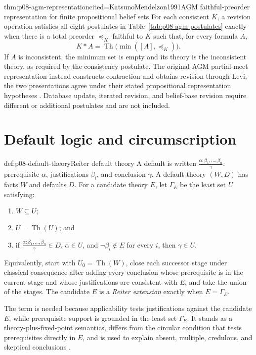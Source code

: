 \begin{hbtheorem}{thm:p08-agm-representation}{cited=KatsunoMendelzon1991}{AGM faithful-preorder representation for finite propositional belief sets}
For each consistent \(K\), a revision operation satisfies all eight postulates
in Table~\ref{tab:p08-agm-postulates} exactly when there is a total preorder
\(\preceq_K\) faithful to \(K\) such that, for every formula \(A\),
\[
 K*A=\operatorname{Th}\bigl(\min([A],\preceq_K)\bigr).
\]
If \(A\) is inconsistent, the minimum set is empty and its theory is the
inconsistent theory, as required by the consistency postulate.  The original
AGM partial-meet representation instead constructs contraction and obtains
revision through Levi; the two presentations agree under their stated
propositional representation hypotheses
\cite{AlchourronGardenforsMakinson1985}.  Database update, iterated revision,
and belief-base revision require different or additional postulates and are not
included.
\end{hbtheorem}

\section{Default logic and circumscription}

\begin{hbdefinition}{def:p08-default-theory}{Reiter default theory}
A default is written
\(\frac{\alpha:\beta_1,\ldots,\beta_n}{\gamma}\): prerequisite \(\alpha\),
justifications \(\beta_i\), and conclusion \(\gamma\). A default theory
\((W,D)\) has facts \(W\) and defaults \(D\).  For a candidate theory \(E\),
let \(\Gamma_E\) be the least set \(U\) satisfying:
\begin{enumerate}
  \item \(W\subseteq U\);
  \item \(U=\operatorname{Th}(U)\); and
  \item if
    \(\frac{\alpha:\beta_1,\ldots,\beta_n}{\gamma}\in D\),
    \(\alpha\in U\), and \(\neg\beta_i\notin E\) for every \(i\), then
    \(\gamma\in U\).
\end{enumerate}
Equivalently, start with \(U_0=\operatorname{Th}(W)\), close each successor
stage under classical consequence after adding every conclusion whose
prerequisite is in the current stage and whose justifications are consistent
with \(E\), and take the union of the stages.  The candidate \(E\) is a
\emph{Reiter extension} exactly when \(E=\Gamma_E\).

The term is needed because applicability tests justifications against the
candidate \(E\), while prerequisite support is grounded in the least set
\(\Gamma_E\).  It stands as a theory-plus-fixed-point semantics, differs from
the circular condition that tests prerequisites directly in \(E\), and is used
to explain absent, multiple, credulous, and skeptical conclusions
\cite{Reiter1980}.
\end{hbdefinition}

